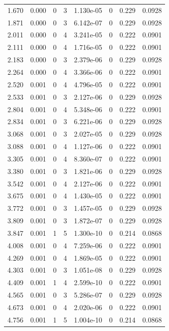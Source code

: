\documentclass[preview]{standalone}
\begin{document}
{{\begin{tabular}{L{1.2cm}C{1.2cm} C{0.3cm}C{0.5cm} C{1.4cm}C{1.4cm} C{1.4cm}C{1.4cm}}
  1.670  &  0.000  & 0     &  3 &  1.130e-05  & 0  & 0.229 &  0.0928   \\ 
  1.871  &  0.000  & 0     &  3 &  6.142e-07  & 0  & 0.229 &  0.0928   \\ 
  2.011  &  0.000  & 0     &  4 &  3.241e-05  & 0  & 0.222 &  0.0901   \\ 
  2.111  &  0.000  & 0     &  4 &  1.716e-05  & 0  & 0.222 &  0.0901   \\ 
  2.183  &  0.000  & 0     &  3 &  2.379e-06  & 0  & 0.229 &  0.0928   \\ 
  2.264  &  0.000  & 0     &  4 &  3.366e-06  & 0  & 0.222 &  0.0901   \\ 
  2.520  &  0.001  & 0     &  4 &  4.796e-05  & 0  & 0.222 &  0.0901   \\ 
  2.533  &  0.001  & 0     &  3 &  2.127e-06  & 0  & 0.229 &  0.0928   \\ 
  2.804  &  0.001  & 0     &  4 &  5.348e-06  & 0  & 0.222 &  0.0901   \\ 
  2.834  &  0.001  & 0     &  3 &  6.221e-06  & 0  & 0.229 &  0.0928   \\ 
  3.068  &  0.001  & 0     &  3 &  2.027e-05  & 0  & 0.229 &  0.0928   \\ 
  3.088  &  0.001  & 0     &  4 &  1.127e-06  & 0  & 0.222 &  0.0901   \\ 
  3.305  &  0.001  & 0     &  4 &  8.360e-07  & 0  & 0.222 &  0.0901   \\ 
  3.380  &  0.001  & 0     &  3 &  1.821e-06  & 0  & 0.229 &  0.0928   \\ 
  3.542  &  0.001  & 0     &  4 &  2.127e-06  & 0  & 0.222 &  0.0901   \\ 
  3.675  &  0.001  & 0     &  4 &  1.430e-05  & 0  & 0.222 &  0.0901   \\ 
  3.772  &  0.001  & 0     &  3 &  1.457e-05  & 0  & 0.229 &  0.0928   \\ 
  3.809  &  0.001  & 0     &  3 &  1.872e-07  & 0  & 0.229 &  0.0928   \\ 
  3.847  &  0.001  & 1     &  5 &  1.300e-10  & 0  & 0.214 &  0.0868   \\ 
  4.008  &  0.001  & 0     &  4 &  7.259e-06  & 0  & 0.222 &  0.0901   \\ 
  4.269  &  0.001  & 0     &  4 &  1.869e-05  & 0  & 0.222 &  0.0901   \\ 
  4.303  &  0.001  & 0     &  3 &  1.051e-08  & 0  & 0.229 &  0.0928   \\ 
  4.409  &  0.001  & 1     &  4 &  2.599e-10  & 0  & 0.222 &  0.0901   \\ 
  4.565  &  0.001  & 0     &  3 &  5.286e-07  & 0  & 0.229 &  0.0928   \\ 
  4.673  &  0.001  & 0     &  4 &  2.020e-06  & 0  & 0.222 &  0.0901   \\ 
  4.756  &  0.001  & 1     &  5 &  1.004e-10  & 0  & 0.214 &  0.0868   \\ 
\hline 
\end{tabular} 

}}
\end{document}
